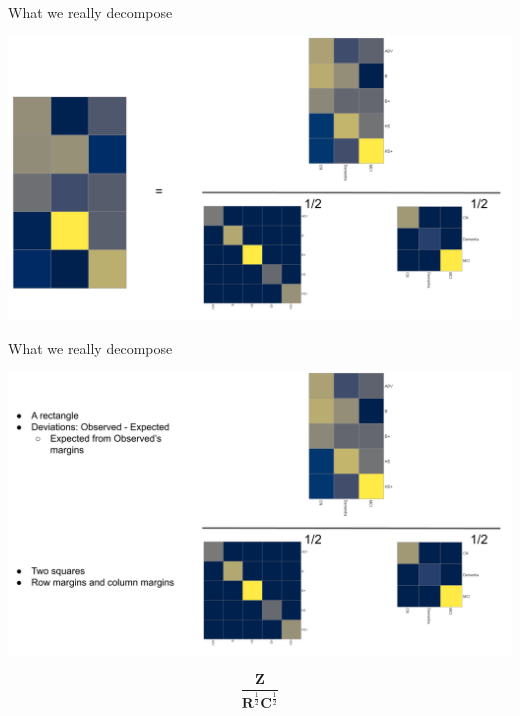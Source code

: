 \documentclass[
  ignorenonframetext,
]{beamer}
\begin{document}
\begin{frame}{What we really decompose}
\protect\hypertarget{what-we-really-decompose}{}

\includegraphics{../images/Deviations_Over_2.png}

\end{frame}

\begin{frame}{What we really decompose}
\protect\hypertarget{what-we-really-decompose-1}{}

\includegraphics{../images/Deviations_Over.png}

\end{frame}

\begin{frame}

\begingroup\Huge

\begin{equation*}
\frac{\mathbf{Z}}{\mathbf{R}^{\frac{1}{2}}\mathbf{C}^{\frac{1}{2}}}
\end{equation*} \endgroup

\end{frame}
\end{document}
